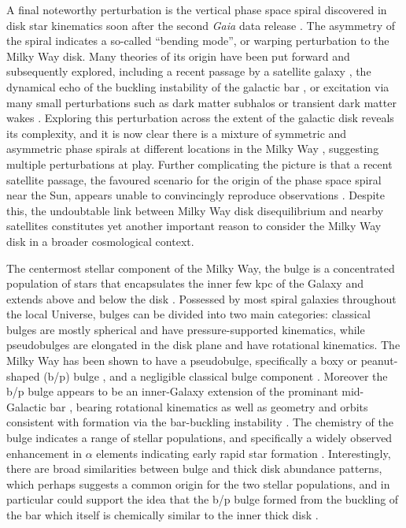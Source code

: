 A final noteworthy perturbation is the vertical phase space spiral discovered in disk star kinematics soon after the second \textit{Gaia} data release \parencite{antoja18}. The asymmetry of the spiral indicates a so-called ``bending mode'', or warping perturbation to the Milky Way disk. Many theories of its origin have been put forward and subsequently explored, including a recent passage by a satellite galaxy \parencite{laporte19}, the dynamical echo of the buckling instability of the galactic bar \parencite{khoperskov19}, or excitation via many small perturbations such as dark matter subhalos or transient dark matter wakes \parencite{tremaine23,grand23}. Exploring this perturbation across the extent of the galactic disk reveals its complexity, and it is now clear there is a mixture of symmetric and asymmetric phase spirals at different locations in the Milky Way \parencite{hunt22}, suggesting multiple perturbations at play. Further complicating the picture is that a recent satellite passage, the favoured scenario for the origin of the phase space spiral near the Sun, appears unable to convincingly reproduce observations \parencite{bennett21,bennett22}. Despite this, the undoubtable link between Milky Way disk disequilibrium and nearby satellites constitutes yet another important reason to consider the Milky Way disk in a broader cosmological context.

The centermost stellar component of the Milky Way, the bulge is a concentrated population of stars that encapsulates the inner few kpc of the Galaxy and extends above and below the disk \parencite{baade46}. Possessed by most spiral galaxies throughout the local Universe, bulges can be divided into two main categories: classical bulges are mostly spherical and have pressure-supported kinematics, while pseudobulges are elongated in the disk plane and have rotational kinematics. The Milky Way has been shown to have a pseudobulge, specifically a boxy or peanut-shaped (b/p) bulge \parencite{ness13a,ness13b,wegg13}, and a negligible classical bulge component \parencite{kunder16}. Moreover the b/p bulge appears to be an inner-Galaxy extension of the prominant mid-Galactic bar \parencite{wegg15}, bearing rotational kinematics as well as geometry and orbits consistent with formation via the bar-buckling instability \parencite{athanassoula05}. The chemistry of the bulge indicates a range of stellar populations, and specifically a widely observed enhancement in $\alpha$ elements indicating early rapid star formation \parencite{mcwilliam16,bensby17}. Interestingly, there are broad similarities between bulge and thick disk abundance patterns, which perhaps suggests a common origin for the two stellar populations, and in particular could support the idea that the b/p bulge formed from the buckling of the bar which itself is chemically similar to the inner thick disk \parencite{dimatteo14}.

